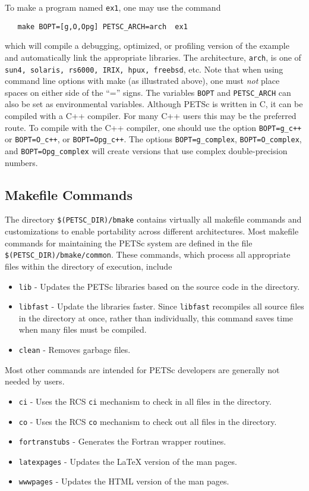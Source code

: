 To make a program named {\tt ex1}, one may use the command
\begin{verbatim}
   make BOPT=[g,O,Opg] PETSC_ARCH=arch  ex1
\end{verbatim}
which will compile a debugging, optimized, or profiling version
of the example and automatically link the appropriate libraries.  The
architecture, {\tt arch}, is one of {\tt sun4, solaris, rs6000, IRIX,
hpux, freebsd}, etc. Note
that when using command line options with make (as illustrated above),
one must {\em not} place spaces on either side of the ``='' signs.
The variables {\tt BOPT} and 
{\tt PETSC\_ARCH} can also be set as environmental
variables.  Although PETSc is written in C, it can be compiled with a 
C++ compiler.  For many C++ users this may be the preferred route. To compile
with the C++ compiler, one should use the option {\tt BOPT=g\_c++} or 
{\tt BOPT=O\_c++}, or {\tt BOPT=Opg\_c++}.  
The options {\tt BOPT=g\_complex}, {\tt BOPT=O\_complex}, and
{\tt BOPT=Opg\_complex} will
create versions that use complex double-precision numbers. 

\subsection{Makefile Commands} \label{sec:common}

The directory {\tt \$(PETSC\_DIR)/bmake} contains virtually all
makefile commands and customizations to enable portability across
different architectures.  Most makefile commands for maintaining the
PETSc system are defined in the file {\tt \$(PETSC\_DIR)/bmake/common}.  
These commands, which process all appropriate files within the
directory of execution, include
\begin{itemize}
\item {\tt lib} - Updates the PETSc libraries based on the source code
      in the directory.
\item {\tt libfast} - Update the libraries faster.  Since
      {\tt libfast} recompiles all source files in the directory at once,
      rather than individually, this command saves time when many files
      must be compiled.
\item {\tt clean} - Removes garbage files.
\end{itemize}
\noindent Most other commands are intended for PETSc developers are generally
not needed by users.
\begin{itemize}
\item {\tt ci} - Uses the RCS {\tt ci} mechanism to check in all files in the
      directory. 
\item {\tt co} - Uses the RCS {\tt co} mechanism to check out 
      all files in the directory. 
\item {\tt fortranstubs} - Generates the Fortran wrapper routines.  
\item {\tt latexpages} - Updates the LaTeX version of the man pages.
\item {\tt wwwpages} - Updates the HTML version of the man pages.
\end{itemize}

